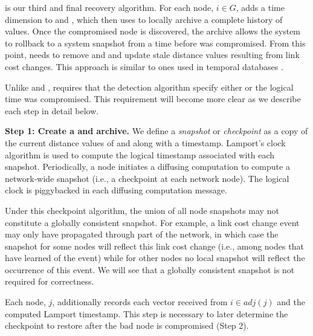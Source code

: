  is our third and final recovery algorithm.  
For each node, $i \in G$, \cpr adds a time dimension to \minvi and \dmatrixis, which \cpr then uses to locally archive a complete history of values. 
Once the compromised node is discovered, the archive allows the system to rollback to a system snapshot from a time before \bad was compromised. From this point, \cpr needs to 
remove \bad and \oldvector and update stale distance values resulting from link cost changes.
This approach is similar to ones used in temporal databases \cite{Jensen91,Lomet06}.

Unlike \second and \purges, \cpr requires that the detection algorithm specify either \badvector or the logical time \bad was compromised.  This requirement will become more clear as 
we describe each \cpr step in detail below.

{\bf Step 1: Create a \minv and \dmatrix archive.} 
	We define a \emph{snapshot} or \emph{checkpoint} as a copy of the current distance values of \minv and \dmatrix along with a timestamp. 
	Lamport's clock algorithm  \cite{Lamport78} is used to compute the logical timestamp associated with each snapshot.  Periodically, a node initiates a diffusing computation to compute a network-wide
	snapshot (i.e., a checkpoint at each network node).  The logical clock is piggybacked in each diffusing computation message. 

	
	Under this checkpoint algorithm, the union of all node snapshots may not constitute a globally consistent snapshot.
 	For example, a link cost change event may only have propagated 
  	through part of the network, in which case the snapshot for some nodes will reflect this link cost change (i.e., among nodes that have learned of the event) 
  	while for other nodes no local snapshot will reflect the occurrence of this event. We will see that a globally consistent snapshot is not required for correctness.  
	
	Each node, $j$, additionally records each \minvi vector received from $i \in adj(j)$ and the computed Lamport timestamp.  This step is necessary to later determine 
	the checkpoint to restore after the bad node is compromised (Step 2).

  


